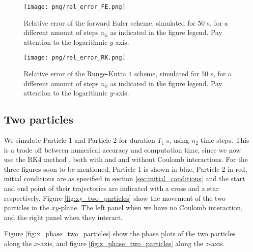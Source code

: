\begin{figure}
    \texttt{[image: png/rel\_error\_FE.png]}
    \caption{Relative error of the forward Euler scheme, simulated for $50$ \textmu s, for a different amount of steps $n_k$ as indicated in the figure legend. Pay attention to the logarithmic $y$-axis.}
    \label{fig:error_FE}
\end{figure}


\begin{figure}
    \texttt{[image: png/rel\_error\_RK.png]}
    \caption{Relative error of the Runge-Kutta 4 scheme, simulated for $50$ \textmu s, for a different amount of steps $n_k$ as indicated in the figure legend. Pay attention to the logarithmic $y$-axis.}
    \label{fig:error_RK}
\end{figure}







\subsection{Two particles}

We simulate Particle 1 and Particle 2 for duration $T_1$ \textmu s,  using $n_2$ time steps. This is a trade off between numerical accuracy and computation time, since we now use the RK4 method , both with and and without Coulomb interactions. For the three figures soon to be mentioned, Particle 1 is shown in blue, Particle 2 in red, initial conditions are as specified in section \ref{sec:initial_conditions} and the start and end point of their trajectories are indicated with a cross and a star respectively. Figure \ref{fig:xy_two_particles} show the movement of the two particles in the $xy$-plane. The left panel when we have no Coulomb interaction, and the right panel when they interact. 

Figure \ref{fig:x_phase_two_particles} show the phase plots of the two particles along the $x$-axis, and figure \ref{fig:z_phase_two_particles} along the $z$-axis.
\newpage
\onecolumngrid


